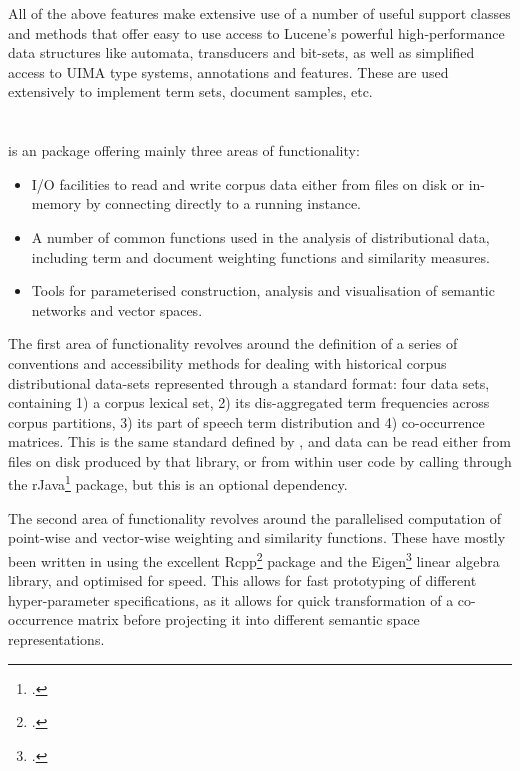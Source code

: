 All of the above features make extensive use of a number of useful support classes and methods that offer easy to use access to Lucene's powerful high-performance data structures like automata, transducers and bit-sets, as well as simplified access to UIMA type systems, annotations and features.
These are used extensively to implement term sets, document samples, etc.

\section{}

 is an \R{} package offering mainly three areas of functionality:
\begin{itemize}
    \item I/O facilities to read and write corpus data either from files on disk or in-memory by connecting directly to a running  instance.
    \item A number of common functions used in the analysis of distributional data, including term and document weighting functions and similarity measures.
    \item Tools for parameterised construction, analysis and visualisation of semantic networks and vector spaces.
\end{itemize}

The first area of functionality revolves around the definition of a series of conventions and accessibility methods for dealing with historical corpus distributional data-sets represented through a standard format: four data sets, containing 1) a corpus lexical set, 2) its dis-aggregated term frequencies across corpus partitions, 3) its part of speech term distribution and 4) co-occurrence matrices.
This is the same standard defined by , and data can be read either from files on disk produced by that library, or from within \R{} user code by calling  through the rJava\footnote{
    \citet{urbanek2018}.
} \R{} package, but this is an optional dependency.

The second area of functionality revolves around the parallelised computation of point-wise and vector-wise weighting and similarity functions.
These have mostly been written in \CPP{} using the excellent Rcpp\footnote{
    \citet{eddelbuettel2018}.
} package and the Eigen\footnote{
    \citet{guennebaud2010}.
} linear algebra library, and optimised for speed.
This allows for fast prototyping of different hyper-parameter specifications, as it allows for quick transformation of a co-occurrence matrix before projecting it into different semantic space representations.

